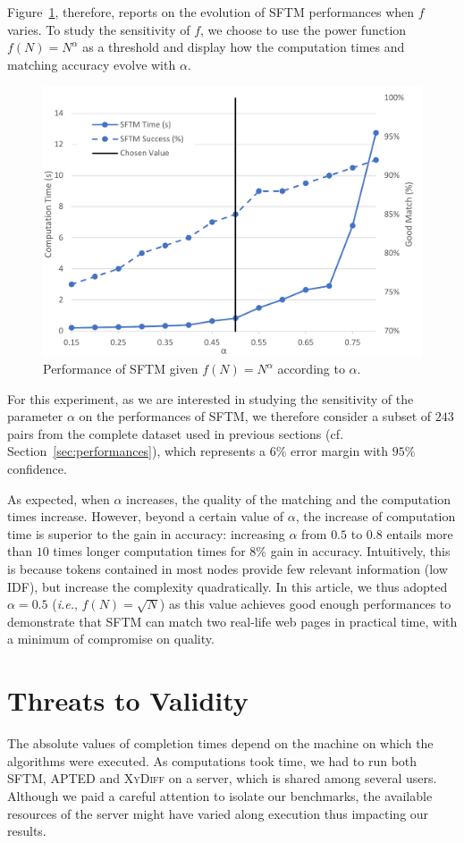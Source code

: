 Figure~\ref{fig:parameter}, therefore, reports on the evolution of SFTM performances when $f$ varies.
To study the sensitivity of $f$, we choose to use the power function $f(N) = N^\alpha$ as a threshold and display how the computation times and matching accuracy evolve with $\alpha$.

\begin{figure}
    \centering
    \includegraphics[width=.8\linewidth]{tree-matching/graphs/sensitivity}
    \caption{Performance of SFTM given $f(N) = N^\alpha$ according to $\alpha$.}
    \label{fig:parameter}
\end{figure}

For this experiment, as we are interested in studying the sensitivity of the parameter $\alpha$ on the performances of SFTM, we therefore consider a subset of $243$ pairs from the complete dataset used in previous sections (cf. Section~\ref{sec:performances}), which represents a $6\%$ error margin with $95\%$ confidence.

As expected, when $\alpha$ increases, the quality of the matching and the computation times increase.
However, beyond a certain value of $\alpha$, the increase of computation time is superior to the gain in accuracy: increasing $\alpha$ from $0.5$ to $0.8$ entails more than $10$ times longer computation times for $8\%$ gain in accuracy. 
Intuitively, this is because tokens contained in most nodes provide few relevant information (low IDF), but increase the complexity quadratically.
In this article, we thus adopted $\alpha = 0.5$ (\emph{i.e.}, $f(N) = \sqrt{N}$) as this value achieves good enough performances to demonstrate that SFTM can match two real-life web pages in practical time, with a minimum of compromise on quality.  

\section{Threats to Validity}\label{sec:threats}
The absolute values of completion times depend on the machine on which the algorithms were executed.
As computations took time, we had to run both SFTM, APTED and \textsc{XyDiff} on a server, which is shared among several users.
Although we paid a careful attention to isolate our benchmarks, the available resources of the server might have varied along execution thus impacting our results.

